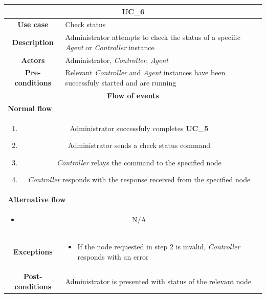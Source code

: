 \documentclass[12pt,a4paper,table]{article}
\begin{document}
            \vspace{0.5cm}
            \noindent
            \begin{longtable}{ |c|p{11.8cm}| }
                \hline
                \multicolumn{2}{|c|}{\cellcolor{lime} \textbf{UC\_6}}\\ \hline
                \cellcolor[gray]{0.9} \textbf{Use case} & Check status\\ \hline
                \cellcolor[gray]{0.9} \textbf{Description} & Administrator attempts to check the status of a specific \textit{Agent} or \textit{Controller} instance\\ \hline
                \cellcolor[gray]{0.9} \textbf{Actors} & Administrator, \textit{Controller}, \textit{Agent}\\ \hline
                \cellcolor[gray]{0.9} \textbf{Pre-conditions} & Relevant \textit{Controller} and \textit{Agent} instances have been successfuly started and are running\\ \hline
                \multicolumn{2}{|c|}{\cellcolor[gray]{0.9} \textbf{Flow of events}}\\ \hline
                \multicolumn{2}{|l|}{\cellcolor[gray]{0.9} \textbf{Normal flow}}\\ \hline
                \multicolumn{2}{|p{14cm}|}{
                    \begin{enumerate}
                        \item Administrator successfuly completes \textbf{UC\_5}
                        \item Administrator sends a check status command
                        \item \textit{Controller} relays the command to the specified node
                        \item \textit{Controller} responds with the response received from the specified node
                    \end{enumerate}
                }\\ \hline
                \multicolumn{2}{|l|}{\cellcolor[gray]{0.9} \textbf{Alternative flow}}\\ \hline
                \multicolumn{2}{|p{14cm}|}{
                    \begin{itemize}
                        \item N/A
                    \end{itemize}
                }\\ \hline
                \cellcolor[gray]{0.9} \textbf{Exceptions} & 
                    \begin{itemize}
                        \item If the node requested in step 2 is invalid, \textit{Controller} responds with an error
                    \end{itemize}\\ \hline
                \cellcolor[gray]{0.9} \textbf{Post-conditions} & Administrator is presented with status of the relevant node\\ \hline
            \end{longtable}
\end{document}
